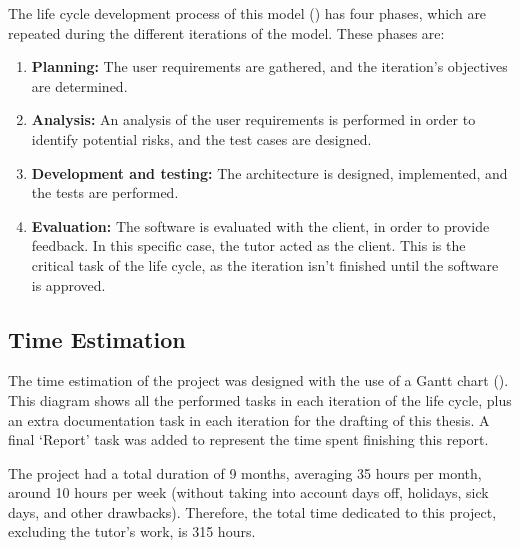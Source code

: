 The life cycle development process of this model () has four phases, which are repeated during the different iterations of the model. These phases are:
\begin{enumerate}
  \item \textbf{Planning:} The user requirements are gathered, and the iteration's objectives are determined.
  \item \textbf{Analysis:} An analysis of the user requirements is performed in order to identify potential risks, and the test cases are designed.
  \item \textbf{Development and testing:} The architecture is designed, implemented, and the tests are performed.
  \item \textbf{Evaluation:} The software is evaluated with the client, in order to provide feedback. In this specific case, the tutor acted as the client. This is the critical task of the life cycle, as the iteration isn't finished until the software is approved.
\end{enumerate}



\subsection{Time Estimation}\label{subsec:time-estimation}
The time estimation of the project was designed with the use of a Gantt chart \parencite{clark1922gantt} (). This diagram shows all the performed tasks in each iteration of the life cycle, plus an extra documentation task in each iteration for the drafting of this thesis. A final `Report' task was added to represent the time spent finishing this report.

The project had a total duration of 9 months, averaging 35 hours per month, around 10 hours per week (without taking into account days off, holidays, sick days, and other drawbacks). Therefore, the total time dedicated to this project, excluding the tutor's work, is 315 hours.


